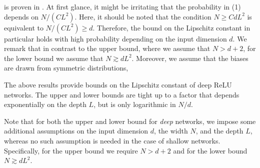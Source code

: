  is proven in .
At first glance, it might be irritating that the probability in (1) depends on $N/(CL^2)$.
Here, it should be noted that the condition $N \geq CdL^2$ is equivalent to $N/(CL^2) \geq d$.
Therefore, the bound on the Lipschitz constant in particular holds with high probability depending
on the input dimension $d$.
We remark that in contrast to the upper bound, where we assume that $N > d+2$,
for the lower bound we assume that $N \gtrsim d L^2$.
Moreover, we assume that the biases are drawn from symmetric distributions,


The above results provide bounds on the Lipschitz constant of deep ReLU networks.
The upper and lower bounds are tight up to a factor that
depends exponentially on the depth $L$, but is only logarithmic in $N/d$.

Note that for both the upper and lower bound for \emph{deep} networks, we impose some additional assumptions
on the input dimension $d$, the width $N$, and the depth $L$,
whereas no such assumption is needed in the case of shallow networks.
Specifically, for the upper bound we require $N > d+2$ and for the lower bound $N \gtrsim d L^2$.


